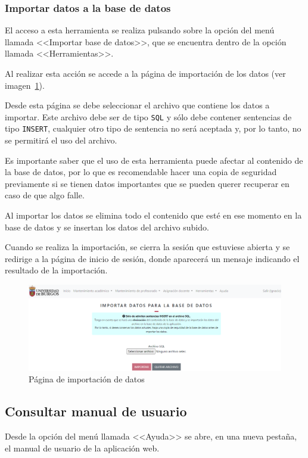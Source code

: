 \subsubsection{Importar datos a la base de datos}
El acceso a esta herramienta se realiza pulsando sobre la opción del menú llamada <<Importar base de datos>>, que se encuentra dentro de la opción llamada <<Herramientas>>.

Al realizar esta acción se accede a la página de importación de los datos (ver imagen~\ref{pag:importar}).

Desde esta página se debe seleccionar el archivo que contiene los datos a importar.
Este archivo debe ser de tipo \texttt{SQL} y sólo debe contener sentencias de tipo \texttt{INSERT}, cualquier otro tipo de sentencia no será aceptada y, por lo tanto, no se permitirá el uso del archivo.

Es importante saber que el uso de esta herramienta puede afectar al contenido de la base de datos, por lo que es recomendable hacer una copia de seguridad previamente si se tienen datos importantes que se pueden querer recuperar en caso de que algo falle.

Al importar los datos se elimina todo el contenido que esté en ese momento en la base de datos y se insertan los datos del archivo subido.

Cuando se realiza la importación, se cierra la sesión que estuviese abierta y se redirige a la página de inicio de sesión, donde aparecerá un mensaje indicando el resultado de la importación.

\begin{figure}
	\centering
	\includegraphics[width=\textwidth]{../img/Anexos/Manual usuario/importar.png}
	\caption{Página de importación de datos}\label{pag:importar}
\end{figure}

\subsection{Consultar manual de usuario}
Desde la opción del menú llamada <<Ayuda>> se abre, en una nueva pestaña, el manual de usuario de la aplicación web.

